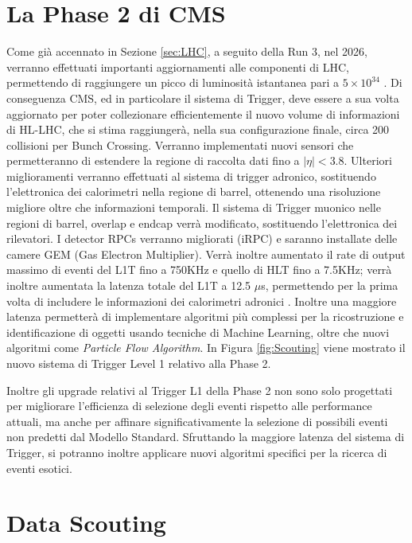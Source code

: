 \section{La Phase 2 di CMS}
\label{sec:Phase2}

Come già accennato in Sezione \ref{sec:LHC}, a seguito della Run 3, nel 2026, verranno effettuati importanti aggiornamenti alle componenti di LHC, permettendo di raggiungere un picco di luminosità istantanea pari a $5 \times 10^{34}$ \Lumi. Di conseguenza CMS, ed in particolare il sistema di Trigger, deve essere a sua volta aggiornato per poter collezionare efficientemente il nuovo volume di informazioni di HL-LHC, che si stima raggiungerà, nella sua configurazione finale, circa 200 collisioni per Bunch Crossing. Verranno implementati nuovi sensori che permetteranno di estendere la regione di raccolta dati fino a $|\eta| < 3.8$. Ulteriori miglioramenti verranno effettuati al sistema di trigger adronico, sostituendo l'elettronica dei calorimetri nella regione di barrel, ottenendo una risoluzione migliore oltre che informazioni temporali. \newline
Il sistema di Trigger muonico nelle regioni di barrel, overlap e endcap verrà modificato, sostituendo l'elettronica dei rilevatori. I detector RPCs verranno migliorati (iRPC) e saranno installate delle camere GEM (Gas Electron Multiplier). \newline
Verrà inoltre aumentato il rate di output massimo di eventi del L1T fino a 750KHz e quello di HLT fino a 7.5KHz; verrà inoltre aumentata la latenza totale del L1T a 12.5 $\mu$s, permettendo per la prima volta di includere le informazioni dei calorimetri adronici \cite{collaboration2021phase}. Inoltre una maggiore latenza permetterà di implementare algoritmi più complessi per la ricostruzione e identificazione di oggetti usando tecniche di Machine Learning, oltre che nuovi algoritmi come \textit{Particle Flow Algorithm}. In Figura \ref{fig:Scouting} viene mostrato il nuovo sistema di Trigger Level 1 relativo alla Phase 2.

Inoltre gli upgrade relativi al Trigger L1 della Phase 2 non sono solo progettati per migliorare l'efficienza di selezione degli eventi rispetto alle performance attuali, ma anche per affinare significativamente la selezione di possibili eventi non predetti dal Modello Standard. Sfruttando la maggiore latenza del sistema di Trigger, si potranno inoltre applicare nuovi algoritmi specifici per la ricerca di eventi esotici.


\section{Data Scouting}
\label{sec:DataScouting}


